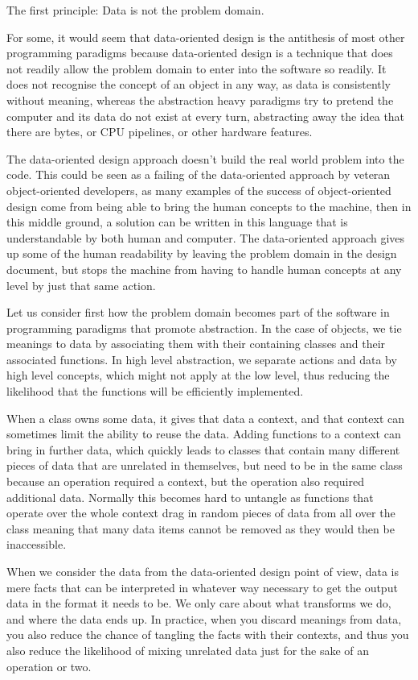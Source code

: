 The first principle: Data is not the problem domain.

For some, it would seem that data-oriented design is the antithesis of
most other programming paradigms because data-oriented design is a technique that does
not readily allow the problem domain to enter into the software so readily. It does
not recognise the concept of an object in any way, as data is consistently
without meaning, whereas the abstraction heavy paradigms try to pretend the
computer and its data do not exist at every turn, abstracting away the idea
that there are bytes, or CPU pipelines, or other hardware features.

The data-oriented design approach doesn't build the real world problem into the
code. This could be seen as a failing of the data-oriented approach by veteran
object-oriented developers, as many examples of the success of object-oriented
design come from being able to bring the human concepts to the machine, then in
this middle ground, a solution can be written in this language that is
understandable by both human and computer. The data-oriented approach gives up
some of the human readability by leaving the problem domain in the design
document, but stops the machine from having to handle human concepts at any
level by just that same action.

Let us consider first how the problem domain becomes part of the software in
programming paradigms that promote abstraction. In the case of objects, we tie
meanings to data by associating them with their containing classes and their
associated functions. In high level abstraction, we separate actions and data
by high level concepts, which might not apply at the low level, thus reducing
the likelihood that the functions will be efficiently implemented.

When a class owns some data, it gives that data a context, and that context can
sometimes limit the ability to reuse the data.  Adding functions to a context
can bring in further data, which quickly leads to classes that contain many
different pieces of data that are unrelated in themselves, but need to be in
the same class because an operation required a context, but the operation also
required additional data. Normally this becomes hard to untangle as functions
that operate over the whole context drag in random pieces of data from all over
the class meaning that many data items cannot be removed as they would then be
inaccessible.

When we consider the data from the data-oriented design point of view, data is
mere facts that can be interpreted in whatever way necessary to get the output
data in the format it needs to be. We only care about what transforms we do,
and where the data ends up. In practice, when you discard meanings from data,
you also reduce the chance of tangling the facts with their contexts, and thus
you also reduce the likelihood of mixing unrelated data just for the sake of an
operation or two.

